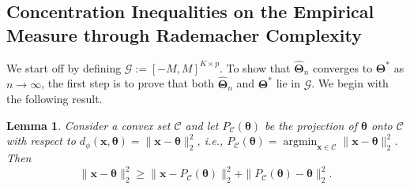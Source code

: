 \documentclass[12pt]{article}
\newtheorem{lemma}{Lemma}[section]
\begin{document}



\subsection{Concentration Inequalities on the Empirical Measure through Rademacher Complexity}

We start off by defining $\mathscr{G} := [-M,M]^{K \times p}$. To show that $\displaystyle \widehat{\bm{\Theta}}_n$ converges to $\bm{\Theta}^*$ as $n \to \infty$, the first step is to prove that both $\widehat{\bm{\Theta}}_n$ and $\displaystyle \bm{\Theta}^*$ lie in $\mathscr{G}$. We begin with the following result.


\begin{lemma}\label{lemma-1-obtuse}
    Consider a convex set $\mathcal{C}$ and let $P_{\mathcal{C}}(\bm{\theta})$ be the projection of $\bm{\theta}$ onto $\mathcal{C}$ with respect to $d_{\phi}(\bm{x},\bm{\theta})=\|\bm{x}-\bm{\theta}\|_2^2$, i.e., $P_\mathcal{C}(\bm{\theta})=\operatorname{argmin}_{\bm{x}\in \mathcal{C}}\|\bm{x}-\bm{\theta}\|_2^2$. Then \[\|\bm{x}-\bm{\theta}\|_2^2\ge \|\bm{x}-P_{\mathcal{C}}(\bm{\theta})\|_2^2+\|P_{\mathcal{C}}(\bm{\theta})-\bm{\theta}\|_2^2.\]
\end{lemma}
\end{document}
